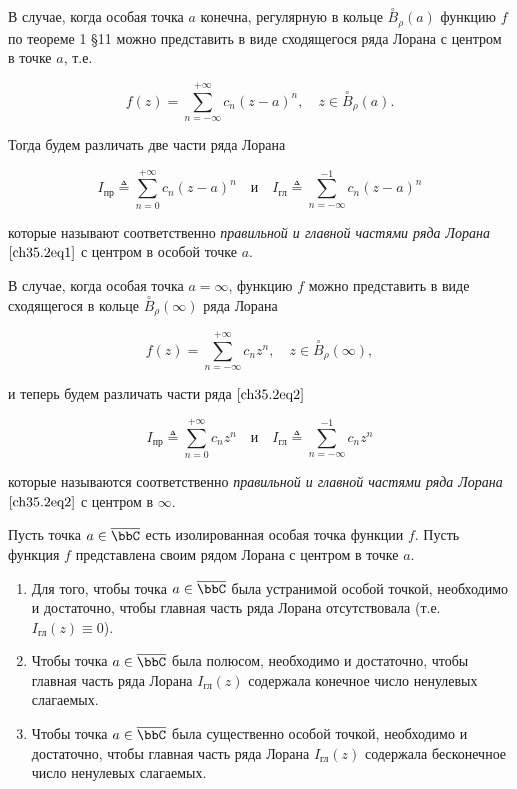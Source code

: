 В случае, когда особая точка $a$ конечна, регулярную в кольце $\overset{\circ}{B}_\rho(a)$ функцию $f$ по теореме 1 \S 11 можно представить в виде сходящегося ряда Лорана с центром в точке $a$, т.е.

\begin{equation} \label{ch35.2eq1}
f(z) = \sum_{n = -\infty}^{+\infty} c_n (z - a)^n, \quad z \in \overset{\circ}{B}_\rho(a).
\end{equation}

Тогда будем различать две части ряда Лорана

$$
I_{\text{пр}} \triangleq \sum_{n = 0}^{+\infty} c_n (z - a)^n \quad \text{и} \quad I_{\text{гл}} \triangleq \sum_{n = -\infty}^{-1} c_n (z - a)^n
$$

которые называют соответственно \textit{правильной и главной частями ряда Лорана} $\eqref{ch35.2eq1}$ с центром в особой точке $a$.

В случае, когда особая точка $a = \infty$, функцию $f$ можно представить в виде сходящегося в кольце $\overset{\circ}{B}_\rho(\infty)$ ряда Лорана

\begin{equation} \label{ch35.2eq2}
f(z) = \sum_{n = -\infty}^{+\infty} c_n z^n, \quad z \in \overset{\circ}{B}_\rho(\infty),
\end{equation}

и теперь будем различать части ряда $\eqref{ch35.2eq2}$

$$
I_{\text{пр}} \triangleq \sum_{n = 0}^{+\infty} c_n z^n \quad \text{и} \quad I_{\text{гл}} \triangleq \sum_{n = -\infty}^{-1} c_n z^n
$$

которые называются соответственно \textit{правильной и главной частями ряда Лорана} $\eqref{ch35.2eq2}$ с центром в $\infty$.

\begin{thm}
Пусть точка $a \in \overline{\bbC}$ есть изолированная особая точка функции $f$. Пусть функция $f$  представлена своим рядом Лорана с центром в точке $a$.

\begin{enumerate}
\item Для того, чтобы точка $a \in \overline{\bbC}$ была устранимой особой точкой, необходимо и достаточно, чтобы главная часть ряда Лорана отсутствовала (т.е. $I_{\text{гл}}(z) \equiv 0$).
\item	Чтобы точка $a \in \overline{\bbC}$ была полюсом, необходимо и достаточно, чтобы главная часть ряда Лорана $I_{\text{гл}}(z)$ содержала конечное число ненулевых слагаемых.
\item	Чтобы точка $a \in \overline{\bbC}$ была существенно особой точкой, необходимо и достаточно, чтобы главная часть ряда Лорана $I_{\text{гл}}(z)$ содержала бесконечное число ненулевых слагаемых.
\end{enumerate}

\end{thm}

